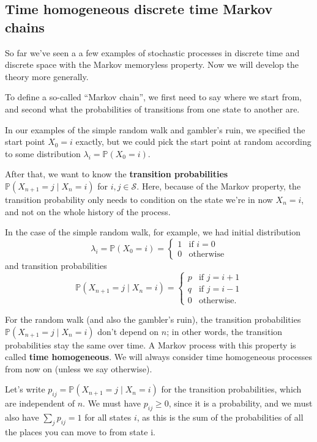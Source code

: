 \documentclass[
  a4paper,
]{article}
\theoremstyle{definition}
\theoremstyle{definition}
\theoremstyle{definition}
\theoremstyle{remark}
\begin{document}
\hypertarget{thmc}{%
\subsection{Time homogeneous discrete time Markov chains}\label{thmc}}

So far we've seen a a few examples of stochastic processes in discrete time and discrete space with the Markov memoryless property. Now we will develop the theory more generally.

To define a so-called ``Markov chain'', we first need to say where we start from, and second what the probabilities of transitions from one state to another are.

In our examples of the simple random walk and gambler's ruin, we specified the start point \(X_0 = i\) exactly, but we could pick the start point at random according to some distribution \(\lambda_i = \mathbb P(X_0 = i)\).

After that, we want to know the \textbf{transition probabilities} \(\mathbb P(X_{n+1} = j \mid X_n = i)\) for \(i,j \in \mathcal S\). Here, because of the Markov property, the transition probability only needs to condition on the state we're in now \(X_n = i\), and not on the whole history of the process.

In the case of the simple random walk, for example, we had initial distribution
\[ \lambda_i = \mathbb P(X_0 = i) = \begin{cases} 1 & \text{if $i = 0$} \\ 0 & \text{otherwise} \end{cases} \]
and transition probabilities
\[ \mathbb P(X_{n+1} = j \mid X_n = i) = \begin{cases} p & \text{if $j = i+1$} \\ q & \text{if $j = i-1$} \\ 0 & \text{otherwise.} \end{cases} \]

For the random walk (and also the gambler's ruin), the transition probabilities \(\mathbb P(X_{n+1} = j \mid X_n = i)\) don't depend on \(n\); in other words, the transition probabilities stay the same over time. A Markov process with this property is called \textbf{time homogeneous}. We will always consider time homogeneous processes from now on (unless we say otherwise).

Let's write \(p_{ij} = \mathbb P(X_{n+1} = j \mid X_n = i)\) for the transition probabilities, which are independent of \(n\).
We must have \(p_{ij} \geq 0\), since it is a probability, and we must also have \(\sum_j p_{ij} = 1\) for all states \(i\), as this is the sum of the probabilities of all the places you can move to from state i.
\end{document}
